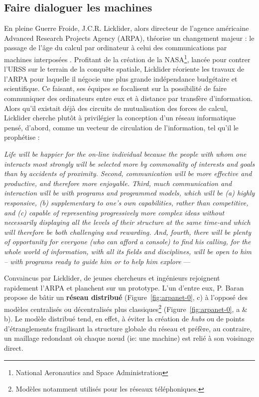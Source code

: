 \documentclass[symmetric,justified,marginals=raggedouter]{tufte-book}
\begin{document}
\subsection{Faire dialoguer les machines}

\noindent En pleine Guerre Froide, J.C.R. Licklider, alors directeur de l'agence américaine Advanced Research Projects Agency (ARPA), théorise un changement majeur : le passage de l'âge du calcul par ordinateur à celui des communications par machines interposées \citep{licklider_computer_1968}. Profitant de la création de la NASA\footnote{\RaggedOuter National Aeronautics and Space Administration}, lancée pour contrer l'URSS sur le terrain de la conquête spatiale, Licklider réoriente les travaux de l'ARPA pour laquelle il négocie une plus grande indépendance budgétaire et scientifique. Ce faisant, ses équipes se focalisent sur la possibilité de faire communiquer des ordinateurs entre eux et à distance par transfère d'information. Alors qu'il existait déjà des circuits de mutualisation des forces de calcul, Licklider cherche plutôt à privilégier la conception d'un réseau informatique pensé, d'abord, comme un vecteur de circulation de l'information, tel qu'il le prophétise : \\

\begin{fullwidth}
\og\textit{Life will be happier for the on-line individual because the people with whom one interacts most strongly will be selected more by commonality of interests and goals than by accidents of proximity. Second, communication will be more effective and productive, and therefore more enjoyable. Third, much communication and interaction will be with programs and programmed models, which will be (a) highly responsive, (b) supplementary to one’s own capabilities, rather than competitive, and (c) capable of representing progressively more complex ideas without necessarily displaying all the levels of their structure at the same time-and which will therefore be both challenging and rewarding. And, fourth, there will be plenty of opportunity for everyone (who can afford a console) to find his calling, for the whole world of information, with all its fields and disciplines, will be open to him – with programs ready to guide him or to help him explore}\fg{} --- \citep[p.21]{licklider_computer_1968}\\
\end{fullwidth}

\noindent Convaincus par Licklider, de jeunes chercheurs et ingénieurs rejoignent rapidement l'ARPA et planchent sur un prototype. L'un d'entre eux, P. Baran propose de bâtir un \textbf{réseau distribué} (Figure~\ref{fig:arpanet-0}, c) à l'opposé des modèles centralisés ou décentralisés plus classiques\footnote{\RaggedOuter Modèles notamment utilisés pour les réseaux téléphoniques.} (Figure~\ref{fig:arpanet-0}, a \& b). Le modèle distribué tend, en effet, à éviter la création de \textit{hubs} ou de points d'étranglements fragilisant la structure globale du réseau et préfère, au contraire, un maillage redondant où chaque nœud (ie: une machine) est relié à son voisinage direct. 
\end{document}
